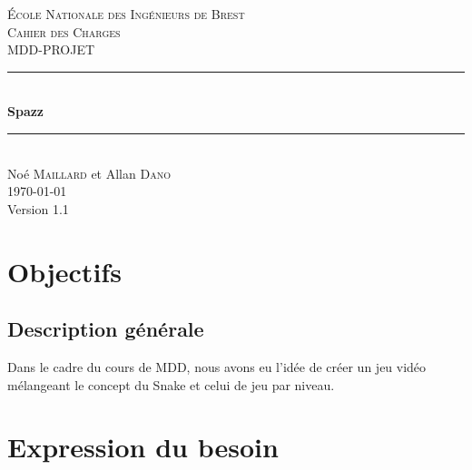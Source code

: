 \documentclass[a4paper,11pt]{scrartcl}
\begin{document}
\begin{titlepage}

\newcommand{\HRule}{\rule{\linewidth}{0.5mm}} %

\center %


\textsc{\LARGE École Nationale des Ingénieurs de Brest}\\[1.5cm]
\textsc{\Large Cahier des Charges}\\[0.5cm]
\textsc{\large MDD-PROJET}\\[0.5cm]


\HRule \\[0.4cm]
{\huge \bfseries Spazz}\\[0.4cm] %
\HRule \\[1.5cm]

\Large
Noé \textsc{Maillard} et Allan \textsc{Dano}\\[3cm]


{\large \today}\\[3cm]

{\large Version 1.1}


\vfill

\end{titlepage}
\newpage
\tableofcontents
\newpage
\section{Objectifs}

\subsection{Description générale}


Dans le cadre du cours de MDD, nous avons eu l'idée de créer un jeu vidéo mélangeant le concept du Snake et celui de jeu par niveau.

\section{Expression du besoin}
\end{document}
